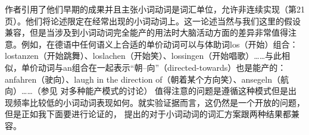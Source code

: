 \begin{exe}
\begin{xlist}[iv.]
\begin{exe}
\begin{xlist}[iv.]
作者引用了他们早期的成果\citep*{CSP2010a}并且主张小词动词是词汇单位，允许非连续实现（第21页）。他们将论述限定在经常出现的小词动词上。这一论述当然与我们这里的假设兼容，但是当涉及到小词动词完全能产的用法时大脑活动方面的差异非常值得注意。例如，在德语中任何语义上合适的单价动词可以与体助词los（开始）组合：lostanzen（开始跳舞）、loslachen（开始笑）、lossingen（开始唱歌）……与此相似，单价动词与an组合在一起表示“朝--向”（directed-towards）也是能产的：anfahren（驶向）、laugh in the direction of（朝着某个方向笑）、ansegeln（航向）……（参见 对多种能产模式的讨论）
值得注意的问题是遵循这种模式但是出现频率比较低的小词动词表现如何。就实验证据而言，这仍然是一个开放的问题，但是正如我下面要进行论证的， \citet{Mueller2003a}提出的对于小词动词的词汇方案跟两种结果都兼容。


\end{xlist}
\end{exe}
\end{xlist}
\end{exe}
